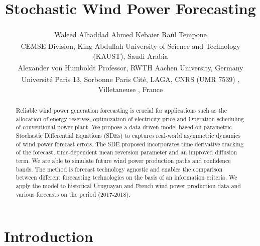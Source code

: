 \documentclass[10pt,twocolumn,letterpaper]{article}
\begin{document}
\title{ Stochastic Wind Power Forecasting }  %

\author{ Waleed Alhaddad\textsuperscript{\textasteriskcentered} \qquad Ahmed Kebaier\textsuperscript{\ddag} \qquad Ra\'ul  Tempone\textsuperscript{\textasteriskcentered}\textsuperscript{\textdagger} \\
\textsuperscript{\textasteriskcentered}CEMSE Division, King Abdullah University of Science and Technology (KAUST), Saudi Arabia \\ \textsuperscript{\textdagger}Alexander von Humboldt Professor, RWTH Aachen University,  Germany
 \\ \textsuperscript{\ddag}Université Paris 13, Sorbonne Paris Cité, LAGA, CNRS (UMR 7539) , Villetaneuse , France }

\maketitle


\begin{abstract}



Reliable wind power generation forecasting is crucial for applications such as the allocation of energy reserves, optimization of electricity price and Operation scheduling of conventional power plant. We propose a data driven model based on parametric Stochastic Differential Equations (SDEs) to captures real-world asymmetric dynamics of wind power forecast errors. The SDE proposed incorporates time derivative tracking of the forecast, time-dependent mean reversion parameter and an improved diffusion term. We are able to simulate future wind power production paths and confidence bands. The method is forecast technology agnostic and enables the comparison between different forecasting technologies on the basis of an information criteria. We apply the model to historical Uruguayan and French wind power production data and various forecasts on the period (2017-2018).


\end{abstract}

\section{Introduction}
\end{document}
